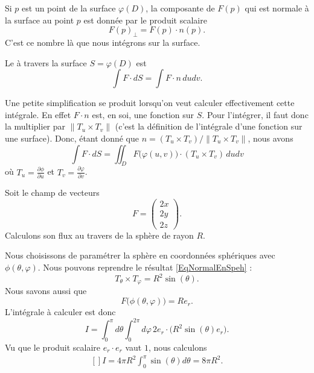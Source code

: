 Si \( p\) est un point de la surface \( \varphi(D)\), la composante de \( F(p)\) qui est normale à la surface au point \( p\) est donnée par le produit scalaire
\begin{equation}
	F(p)_{\perp}=F(p)\cdot n(p).
\end{equation}
C'est ce nombre là que nous intégrons sur la surface.

\begin{definition}
	Le  à travers la surface \( S=\varphi(D)\) est
	\begin{equation}
		\int F\cdot dS=\int F \cdot n\,dudv.
	\end{equation}
\end{definition}

Une petite simplification se produit lorsqu'on veut calculer effectivement cette intégrale. En effet \( F\cdot n\) est, en soi, une fonction sur \( S\). Pour l'intégrer, il faut donc la multiplier par \( \| T_u\times T_v \|\) (c'est la définition de l'intégrale d'une fonction sur une surface). Donc, étant donné que \( n=(T_u\times T_v)/\| T_u\times T_v \|\), nous avons
\begin{equation}
	\int F\cdot dS=\iint_D F\big( \varphi(u,v) \big)\cdot (T_u\times T_v)\,dudv
\end{equation}
où \( T_u=\frac{ \partial \phi }{ \partial u }\) et \( T_v=\frac{ \partial \varphi }{ \partial v }\).


\begin{example}
	Soit le champ de vecteurs
	\begin{equation}
		F=\begin{pmatrix}
			2x \\
			2y \\
			2z
		\end{pmatrix}.
	\end{equation}
	Calculons son flux au travers de la sphère de rayon \( R\).

	Nous choisissons de paramétrer la sphère en coordonnées sphériques avec \( \phi(\theta,\varphi)\). Nous pouvons reprendre le résultat \eqref{EqNormalEnSpeh} :
	\begin{equation}
		T_{\theta}\times T_{\varphi}=R^2\sin(\theta).
	\end{equation}
	Nous savons aussi que
	\begin{equation}
		F\big( \phi(\theta,\varphi) \big)=Re_r.
	\end{equation}
	L'intégrale à calculer est donc
	\begin{equation}
		I=\int_0^{\pi}d\theta\int_0^{2\pi}d\varphi\, 2e_r\cdot\big( R^2\sin(\theta)e_r \big).
	\end{equation}
	Vu que le produit scalaire \( e_r\cdot e_r\) vaut \( 1\), nous calculons
	\begin{equation}
		\begin{aligned}[]
			I=4\pi R^2\int_0^{\pi}\sin(\theta)d\theta=8\pi R^2.
		\end{aligned}
	\end{equation}

\end{example}

